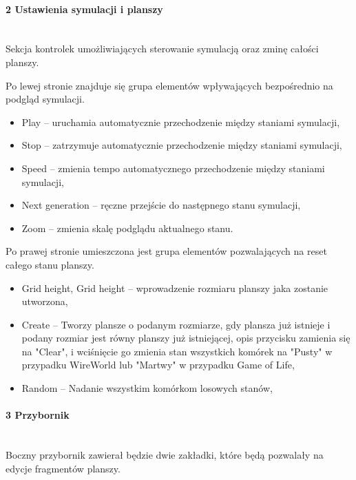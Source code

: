 \documentclass{report}
\begin{document}
\paragraph{2 Ustawienia symulacji i planszy} \mbox{} \\
Sekcja kontrolek umożliwiających sterowanie symulacją oraz zminę całości planszy.

Po lewej stronie znajduje się grupa elementów wpływających bezpośrednio na podgląd symulacji.
\begin{itemize}
    \item Play -- uruchamia automatycznie przechodzenie między staniami symulacji,
    \item Stop -- zatrzymuje automatycznie przechodzenie między staniami symulacji,
    \item Speed -- zmienia tempo automatycznego przechodzenie między staniami symulacji,
    \item Next generation -- ręczne przejście do następnego stanu symulacji,
    \item Zoom -- zmienia skalę podglądu aktualnego stanu.
\end{itemize}

Po prawej stronie umieszczona jest grupa elementów pozwalających na reset całego stanu planszy.
\begin{itemize}
    \item Grid height, Grid height -- wprowadzenie rozmiaru planszy jaka zostanie utworzona,
    \item Create -- Tworzy plansze o podanym rozmiarze, gdy plansza już istnieje i podany rozmiar jest równy planszy już istniejącej, opis 			przycisku zamienia się na "Clear", i wciśnięcie go zmienia stan wszystkich komórek na "Pusty" w przypadku WireWorld lub "Martwy" w 		przypadku Game of Life,
    \item Random -- Nadanie wszystkim komórkom losowych stanów,
\end{itemize}

\paragraph{3 Przybornik} \mbox{} \\
Boczny przybornik zawierał będzie dwie zakładki, które będą pozwalały na edycje fragmentów planszy.
\end{document}

